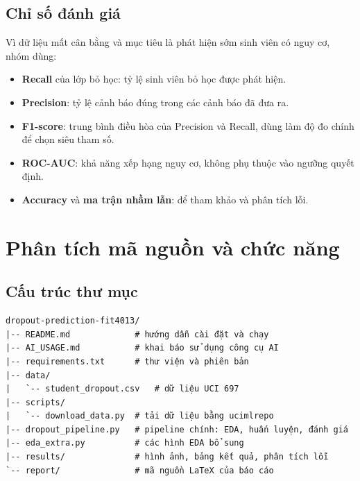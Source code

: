 \documentclass[12pt,a4paper]{article}
\begin{document}
\subsection{Chỉ số đánh giá}
Vì dữ liệu mất cân bằng và mục tiêu là phát hiện sớm sinh viên có nguy cơ, nhóm dùng:
\begin{itemize}
  \item \textbf{Recall} của lớp bỏ học: tỷ lệ sinh viên bỏ học được phát hiện.
  \item \textbf{Precision}: tỷ lệ cảnh báo đúng trong các cảnh báo đã đưa ra.
  \item \textbf{F1-score}: trung bình điều hòa của Precision và Recall, dùng làm độ đo chính để chọn siêu tham số.
  \item \textbf{ROC-AUC}: khả năng xếp hạng nguy cơ, không phụ thuộc vào ngưỡng quyết định.
  \item \textbf{Accuracy} và \textbf{ma trận nhầm lẫn}: để tham khảo và phân tích lỗi.
\end{itemize}

\section{Phân tích mã nguồn và chức năng}

\subsection{Cấu trúc thư mục}
\begin{verbatim}
dropout-prediction-fit4013/
|-- README.md             # hướng dẫn cài đặt và chạy
|-- AI_USAGE.md           # khai báo sử dụng công cụ AI
|-- requirements.txt      # thư viện và phiên bản
|-- data/
|   `-- student_dropout.csv   # dữ liệu UCI 697
|-- scripts/
|   `-- download_data.py  # tải dữ liệu bằng ucimlrepo
|-- dropout_pipeline.py   # pipeline chính: EDA, huấn luyện, đánh giá
|-- eda_extra.py          # các hình EDA bổ sung
|-- results/              # hình ảnh, bảng kết quả, phân tích lỗi
`-- report/               # mã nguồn LaTeX của báo cáo
\end{verbatim}
\end{document}
